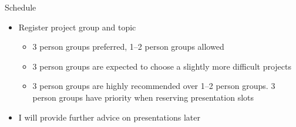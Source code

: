 \documentclass[t]{beamer}
\begin{document}
\begin{frame}
  
  {\Large\color{navyblue} Schedule}


  \begin{itemize}
  \item Register project group and topic%
    \begin{itemize}
    \item 3 person groups preferred, 1--2 person groups allowed
    \item 3 person groups are expected to choose a slightly more difficult projects
	\item 3 person groups are highly recommended over 1--2 person groups. 3 person groups have priority when reserving presentation slots
    \end{itemize}
  \item I will provide further advice on presentations later
  \end{itemize}
  
\end{frame}
\end{document}
